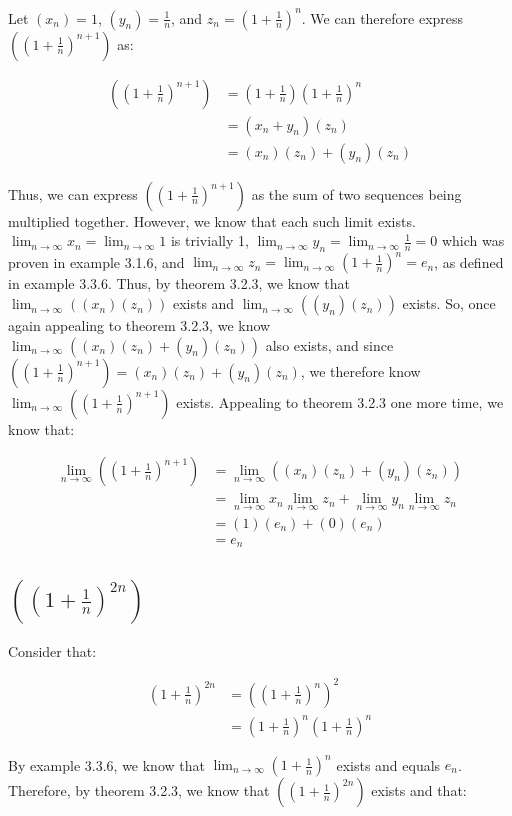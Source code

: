 \documentclass{article}
\begin{document}
Let $(x_n) = 1$, $(y_n) = \frac{1}{n}$, and $z_n = (1+\frac{1}{n})^n$. We can therefore express $((1+\frac{1}{n})^{n+1})$ as:

\begin{align*}
	((1 + \frac{1}{n})^{n+1}) &= (1 + \frac{1}{n})(1 + \frac{1}{n})^n \\
	&= (x_n + y_n)(z_n) \\
	&= (x_n)(z_n) + (y_n)(z_n)
\end{align*}

Thus, we can express $((1+\frac{1}{n})^{n+1})$ as the sum of two sequences being multiplied together. However, we know that each such limit exists. $\lim_{n\to\infty}{x_n} = \lim_{n\to\infty}{1}$ is trivially 1, $\lim_{n\to\infty}{y_n} = \lim_{n\to\infty}{\frac{1}{n}} = 0$ which was proven in example 3.1.6, and $\lim_{n\to\infty}{z_n} = \lim_{n\to\infty}{(1 + \frac{1}{n})^{n}} = e_n$, as defined in example 3.3.6. Thus, by theorem 3.2.3, we know that $\lim_{n\to\infty}((x_n)(z_n))$ exists and $\lim_{n\to\infty}((y_n)(z_n))$ exists. So, once again appealing to theorem 3.2.3, we know $\lim_{n\to\infty}((x_n)(z_n) + (y_n)(z_n))$ also exists, and since $((1+\frac{1}{n})^{n+1}) = (x_n)(z_n) + (y_n)(z_n)$, we therefore know $\lim_{n\to\infty}((1+\frac{1}{n})^{n+1})$ exists. Appealing to theorem 3.2.3 one more time, we know that:

\begin{align*}
	\lim_{n\to\infty}((1+\frac{1}{n})^{n+1}) &= \lim_{n\to\infty}((x_n)(z_n) + (y_n)(z_n)) \\
	&= \lim_{n\to\infty}{x_n}\lim_{n\to\infty}{z_n} + \lim_{n\to\infty}{y_n}\lim_{n\to\infty}{z_n} \\
	&= (1)(e_n) + (0)(e_n) \\
	&= e_n
\end{align*}

\subsection{$((1+\frac{1}{n})^{2n})$}

Consider that:

\begin{align*}
	(1+\frac{1}{n})^{2n} &= ((1+\frac{1}{n})^{n})^{2} \\
	&= (1+\frac{1}{n})^{n}(1+\frac{1}{n})^{n}
\end{align*}

By example 3.3.6, we know that $\lim_{n\to\infty}(1 + \frac{1}{n})^n$ exists and equals $e_n$. Therefore, by theorem 3.2.3, we know that $((1+\frac{1}{n})^{2n})$ exists and that:
\end{document}
